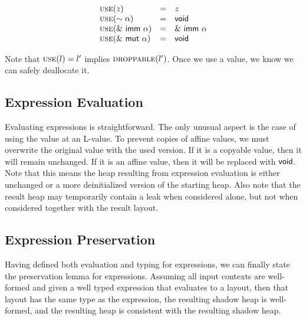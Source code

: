 
\[
\begin{array}{lcl}
\textsc{use}(z) &=& z \\
\textsc{use}(\sim{\alpha}) &=& \mathsf{void} \\
\textsc{use}(\&~{{\mathsf{imm}}~{\alpha}}) &=& \&~{{\mathsf{imm}}~{\alpha}} \\
\textsc{use}(\&~{{\mathsf{mut}}~{\alpha}}) &=& \mathsf{void}
\end{array}
\]

Note that $\textsc{use}(l) = l'$ implies $\textsc{droppable}(l')$.
Once we use a value, we know we can safely deallocate it.

\subsection*{Expression Evaluation}
Evaluating expressions is straightforward.
The only unusual aspect is the case of using the value at an L-value.
To prevent copies of affine values, we must overwrite the original value
with the used version. If it is a copyable value, then it will remain unchanged.
If it is an affine value, then it will be replaced with $\mathsf{void}$.
Note that this means the heap resulting from expression evaluation is either
unchanged or a more deinitialized version of the starting heap.
Also note that the result heap may temporarily contain a leak when considered alone,
but not when considered together with the result layout.
\newline



\subsection*{Expression Preservation}
Having defined both evaluation and typing for expressions, we can finally
state the preservation lemma for expressions. Assuming all input contexts are
well-formed and given a well typed expression that evaluates to a layout,
then that layout has the same type as the expression, the resulting shadow heap
is well-formed, and the resulting heap is consistent with the resulting shadow heap.

